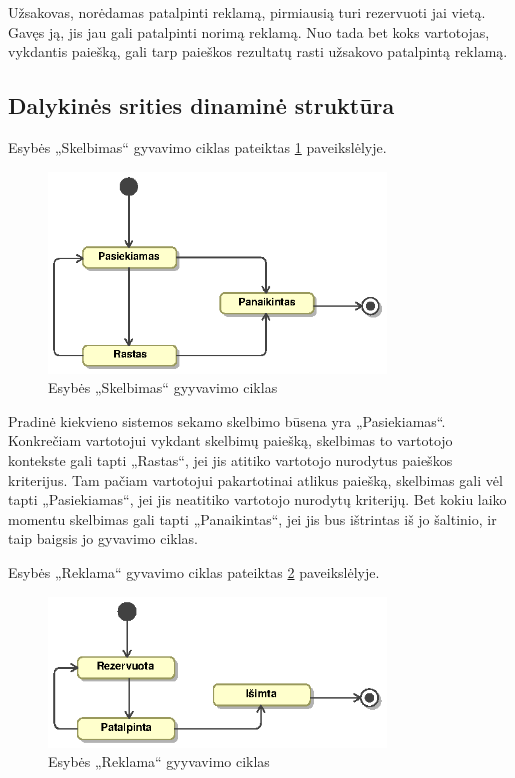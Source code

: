 \documentclass[12pt]{article}
\begin{document}
	Užsakovas, norėdamas patalpinti reklamą, pirmiausią turi rezervuoti jai vietą. Gavęs ją, jis jau gali patalpinti norimą reklamą. Nuo tada bet koks vartotojas, vykdantis paiešką, gali tarp paieškos rezultatų rasti užsakovo patalpintą reklamą.
	\pagebreak
	
	\subsection{Dalykinės srities dinaminė struktūra}
	
	Esybės „Skelbimas“ gyvavimo ciklas pateiktas \ref{AdvertState} paveikslėlyje.
	
	\begin{figure}[h]
		\begin{center}
			\includegraphics[width=0.8\textwidth]{SkelbimoBusena.eps}
			\caption{Esybės „Skelbimas“ gyyvavimo ciklas\label{AdvertState}}
		\end{center}
	\end{figure}
	
	Pradinė kiekvieno sistemos sekamo skelbimo būsena yra „Pasiekiamas“. Konkrečiam vartotojui vykdant skelbimų paiešką, skelbimas to vartotojo kontekste gali tapti „Rastas“, jei jis atitiko vartotojo nurodytus paieškos kriterijus. Tam pačiam vartotojui pakartotinai atlikus paiešką, skelbimas gali vėl tapti „Pasiekiamas“, jei jis neatitiko vartotojo nurodytų kriterijų. Bet kokiu laiko momentu skelbimas gali tapti „Panaikintas“, jei jis bus ištrintas iš jo šaltinio, ir taip baigsis jo gyvavimo ciklas.
	\pagebreak	
	
	Esybės „Reklama“ gyvavimo ciklas pateiktas \ref{AdState} paveikslėlyje.
	
	\begin{figure}[h]
		\begin{center}
			\includegraphics[width=0.8\textwidth]{ReklamosBusena.eps}
			\caption{Esybės „Reklama“ gyyvavimo ciklas\label{AdState}}
		\end{center}
	\end{figure}
	
\end{document}

